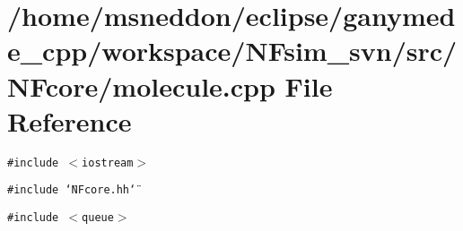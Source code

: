 \section{/home/msneddon/eclipse/ganymede\_\-cpp/workspace/NFsim\_\-svn/src/NFcore/molecule.cpp File Reference}
\label{molecule_8cpp}


{\tt \#include $<$iostream$>$}\par
{\tt \#include \char`\"{}NFcore.hh\char`\"{}}\par
{\tt \#include $<$queue$>$}\par
